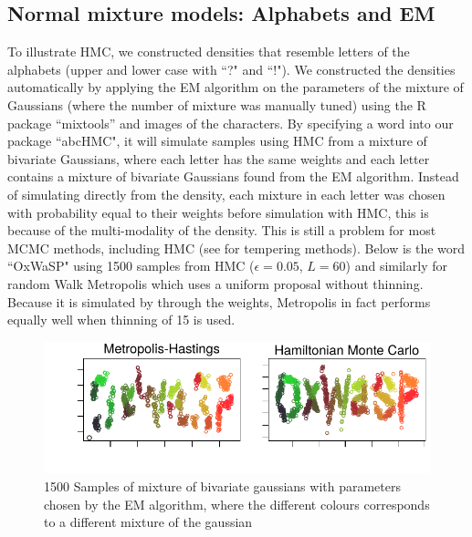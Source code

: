 \documentclass[11pt]{article}
\begin{document}
\subsection{Normal mixture models: Alphabets and EM}
To illustrate HMC, we constructed densities that resemble letters of the alphabets (upper and lower case with ``?" and ``!"). We constructed the densities automatically by applying the EM algorithm on the parameters of the mixture of Gaussians (where the number of mixture was manually tuned) using the R package ``mixtools'' and images of the characters. By specifying a word into our package ``abcHMC", it will simulate samples using HMC from a mixture of bivariate Gaussians, where each letter has the same weights and each letter contains a mixture of bivariate Gaussians found from the EM algorithm. Instead of simulating directly from the density, each mixture in each letter was chosen with probability equal to their weights before simulation with HMC, this is because of the multi-modality of the density. This is still a problem for most MCMC methods, including HMC (see \cite{neal} for tempering methods). Below is the word ``OxWaSP" using 1500 samples from HMC ($\epsilon=0.05$, $L=60$) and similarly for random Walk Metropolis which uses a uniform proposal without thinning. Because it is simulated by through the weights, Metropolis in fact performs equally well when thinning of 15 is used.
\begin{figure}[H]
\center
  \includegraphics[width=5in]{images/oxwasp.pdf}
  \caption{1500 Samples of mixture of bivariate gaussians with parameters chosen by the EM algorithm, where the different colours corresponds to a different mixture of the gaussian}
\end{figure}
\end{document}
